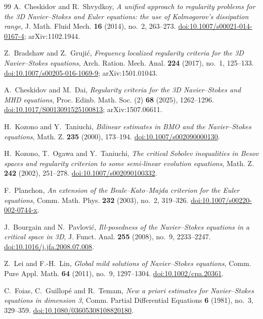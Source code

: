 \documentclass[11pt]{article}
\theoremstyle{definition}
\begin{document}
\begin{thebibliography}{99}
A.~Cheskidov and R.~Shvydkoy,
\emph{A unified approach to regularity problems for the 3D Navier--Stokes and
Euler equations: the use of Kolmogorov's dissipation range},
J. Math. Fluid Mech. \textbf{16} (2014), no.~2, 263--273.
\href{https://doi.org/10.1007/s00021-014-0167-4}{doi:10.1007/s00021-014-0167-4};
arXiv:1102.1944.

Z.~Bradshaw and Z.~Gruji\'c,
\emph{Frequency localized regularity criteria for the 3D Navier--Stokes
equations},
Arch. Ration. Mech. Anal. \textbf{224} (2017), no.~1, 125--133.
\href{https://doi.org/10.1007/s00205-016-1069-9}{doi:10.1007/s00205-016-1069-9};
arXiv:1501.01043.

A.~Cheskidov and M.~Dai,
\emph{Regularity criteria for the 3D Navier--Stokes and MHD equations},
Proc. Edinb. Math. Soc. (2) \textbf{68} (2025), 1262--1296.
\href{https://doi.org/10.1017/S0013091525100813}{doi:10.1017/S0013091525100813};
arXiv:1507.06611.

H.~Kozono and Y.~Taniuchi,
\emph{Bilinear estimates in BMO and the Navier--Stokes equations},
Math. Z. \textbf{235} (2000), 173--194.
\href{https://doi.org/10.1007/s002090000130}{doi:10.1007/s002090000130}.

H.~Kozono, T.~Ogawa and Y.~Taniuchi,
\emph{The critical Sobolev inequalities in Besov spaces and regularity
criterion to some semi-linear evolution equations},
Math. Z. \textbf{242} (2002), 251--278.
\href{https://doi.org/10.1007/s002090100332}{doi:10.1007/s002090100332}.

F.~Planchon,
\emph{An extension of the Beale--Kato--Majda criterion for the Euler
equations},
Comm. Math. Phys. \textbf{232} (2003), no.~2, 319--326.
\href{https://doi.org/10.1007/s00220-002-0744-x}{doi:10.1007/s00220-002-0744-x}.

J.~Bourgain and N.~Pavlovi\'c,
\emph{Ill-posedness of the Navier--Stokes equations in a critical space in 3D},
J. Funct. Anal. \textbf{255} (2008), no.~9, 2233--2247.
\href{https://doi.org/10.1016/j.jfa.2008.07.008}{doi:10.1016/j.jfa.2008.07.008}.

Z.~Lei and F.-H.~Lin,
\emph{Global mild solutions of Navier--Stokes equations},
Comm. Pure Appl. Math. \textbf{64} (2011), no.~9, 1297--1304.
\href{https://doi.org/10.1002/cpa.20361}{doi:10.1002/cpa.20361}.

C.~Foias, C.~Guillop\'e and R.~Temam,
\emph{New a priori estimates for Navier--Stokes equations in dimension 3},
Comm. Partial Differential Equations \textbf{6} (1981), no.~3, 329--359.
\href{https://doi.org/10.1080/03605308108820180}{doi:10.1080/03605308108820180}.


\end{thebibliography}
\end{document}
